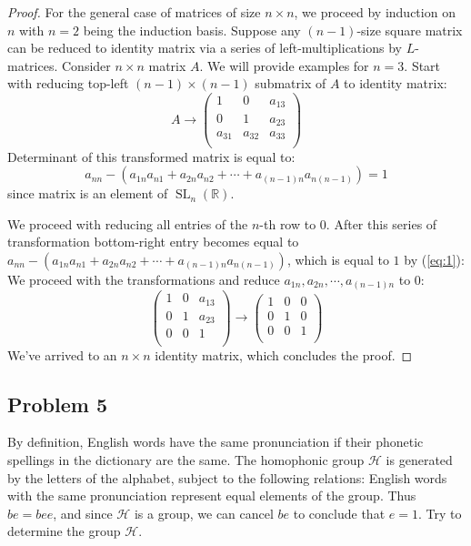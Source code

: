 \documentclass{article}
\newcommand{\R}{\mathbb{R}}
\newcommand{\SL}[2]{\operatorname{SL}_{#1}(#2)}
\newcommand{\SLnR}{\SL{n}{\R}}
\begin{document}
\begin{proof}
For the general case of matrices of size $n \times n$, we proceed by induction on $n$ with $n=2$ being the induction basis.
Suppose any $(n-1)$-size square matrix can be reduced to identity matrix via a series of left-multiplications by $L$-matrices.
Consider $n \times n$ matrix $A$.
We will provide examples for $n=3$.
Start with reducing top-left $(n-1) \times (n-1)$ submatrix of $A$ to identity matrix:
\[ A \to
    \begin{pmatrix}
        1 & 0 & a_{13} \\
        0 & 1 & a_{23} \\
        a_{31} & a_{32} & a_{33} \\
    \end{pmatrix}
\]
Determinant of this transformed matrix is equal to:
\begin{equation} \label{eq:1}
    a_{nn} - \left( a_{1n}a_{n1} + a_{2n}a_{n2} + \cdots + a_{(n-1)n}a_{n(n-1)} \right) = 1    
\end{equation}
since matrix is an element of $\SLnR$.

We proceed with reducing all entries of the $n$-th row to $0$.
After this series of transformation bottom-right entry becomes equal to $a_{nn} - ( a_{1n}a_{n1} + a_{2n}a_{n2} + \cdots + a_{(n-1)n}a_{n(n-1)})$, which is equal to $1$ by (\ref{eq:1}):
We proceed with the transformations and reduce $a_{1n}, a_{2n}, \cdots, a_{(n-1)n}$ to $0$:
\[
    \begin{pmatrix}
        1 & 0 & a_{13} \\
        0 & 1 & a_{23} \\
        0 & 0 & 1 \\
    \end{pmatrix}
    \to
    \begin{pmatrix}
        1 & 0 & 0 \\
        0 & 1 & 0 \\
        0 & 0 & 1 \\
    \end{pmatrix}
\]
We've arrived to an $n \times n$ identity matrix, which concludes the proof.

\end{proof}


\subsection*{Problem 5}

\begin{tcolorbox}
By definition, English words have the same pronunciation if their phonetic spellings in the dictionary are the same.
The homophonic group $\mathcal{H}$ is generated by the letters of the alphabet, subject to the following relations: English words with the same pronunciation represent equal elements of the group.
Thus $be = bee$, and since $\mathcal{H}$ is a group, we can cancel $be$ to conclude that $e=1$. Try to determine the group $\mathcal{H}$.
\end{tcolorbox}
\end{document}
